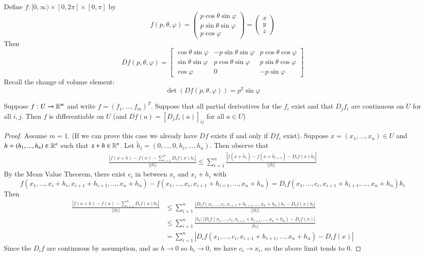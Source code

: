\begin{example}
    Define $f:[0,\infty)\times [0,2\pi]\times [0,\pi]$ by $$f(p,\theta,\varphi) = \begin{pmatrix} p\cos\theta\sin\varphi \\ p\sin\theta\sin\varphi \\ p\cos\varphi\end{pmatrix} = \begin{pmatrix} x \\ y \\ z \end{pmatrix}$$ Then $$Df(p,\theta,\varphi) = \begin{bmatrix} \cos\theta\sin\varphi & -p\sin\theta\sin\varphi & p\cos\theta\cos\varphi \\ \sin\theta\sin\varphi & p\cos\theta\sin\varphi & p\sin\theta\cos\varphi \\ \cos\varphi & 0 & -p\sin\varphi \end{bmatrix}$$
    Recall the change of volume element: $$\det(Df(p,\theta,\varphi)) = p^2\sin\varphi$$
\end{example}

\begin{proposition}
    Suppose $f:U\rightarrow \mathbb R^m$ and write $f= (f_1,...,f_m)^T$. Suppose that all partial derivatives for the $f_i$ exist and that $D_jf_i$ are continuous on $U$ for all $i,j$. Then $f$ is differentiable on $U$ (and $Df(a) = [D_jf_i(a)]_{ij}$ for all $a \in U$)
\end{proposition}
\begin{proof}
    Assume $m = 1$. (If we can prove this case we already have $Df$ exists if and only if $Df_i$ exist). Suppose $x=(x_1,...,x_n) \in U$ and $h = (h_1,...,h_n) \in \mathbb R^n$ such that $x+h \in \mathbb R^n$. Let $\tilde{h}_i = (0,...,0,h_i,...,h_n)$.  Then observe that \begin{align*}
        \frac{|f(x+h) - f(x) - \sum_{i=1}^nD_if(x)h_i|}{||h||} \leq \sum_{i=1}^n\frac{|f(x+\tilde{h}_i) - f(x+\tilde{h}_{i+1}) -D_if(x)h_i|}{||h||}
    \end{align*}
    By the Mean Value Theorem, there exist $c_i$ in between $x_i$ and $x_i+h_i$ with $$f(x_1,...,x_i+h_i,x_{i+1}+h_{i+1},...,x_n+h_n) - f(x_1,...,x_i,x_{i+1}+h_{i+1},...,x_n+h_n)  = D_if(x_1,...,c_i,x_{i+1}+h_{i+1},...,x_n+h_n)h_i$$ Then \begin{align*}
        \frac{|f(x+h) - f(x) - \sum_{i=1}^nD_if(x)h_i|}{||h||} &\leq \sum_{i=1}^n\frac{|D_if(x_1,...,c_i,x_{i+1}+h_{i+1},...,x_n+h_n)h_i-D_if(x)h_i|}{||h||} \\
        &\leq \sum_{i=1}^n\frac{|h_i|\;|D_if(x_1,...,c_i,x_{i+1}+h_{i+1},...,x_n+h_n)-D_if(x)|}{|h_i|} \\
        &= \sum_{i=1}^n|D_if(x_1,...,c_i,x_{i+1}+h_{i+1},...,x_n+h_n)-D_if(x)|
    \end{align*}
    Since the $D_if$ are continuous by assumption, and as $h\rightarrow 0$ so $h_i\rightarrow 0$, we have $c_i\rightarrow x_i$, so the above limit tends to $0$.
\end{proof}

